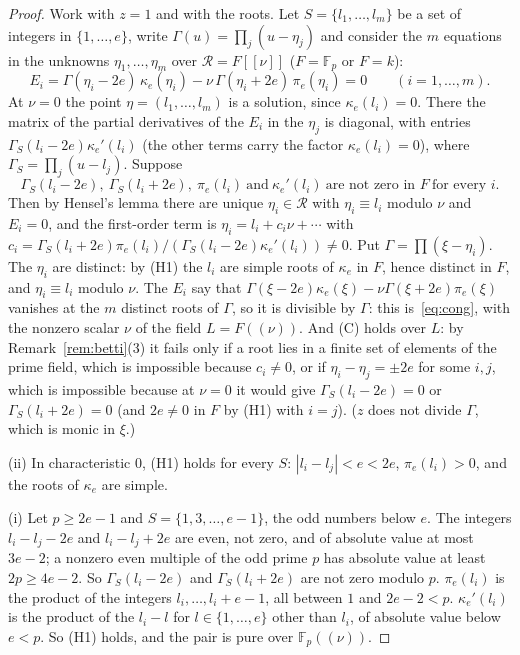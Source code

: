 \documentclass[11pt]{article}
\theoremstyle{definition}
\theoremstyle{remark}
\newcommand{\F}{\mathbb{F}}
\begin{document}
\begin{proof}
Work with $z=1$ and with the roots. Let $S=\{l_1,\dots,l_m\}$ be a set of integers in $\{1,\dots,e\}$, write $\Gamma(u)=\prod_j(u-\eta_j)$ and consider the $m$ equations in the unknowns $\eta_1,\dots,\eta_m$ over $\mathcal R=F[[\nu]]$ ($F=\F_p$ or $F=k$):
\[
E_i=\Gamma(\eta_i-2e)\,\kappa_e(\eta_i)-\nu\,\Gamma(\eta_i+2e)\,\pi_e(\eta_i)=0\qquad(i=1,\dots,m).
\]
At $\nu=0$ the point $\eta=(l_1,\dots,l_m)$ is a solution, since $\kappa_e(l_i)=0$. There the matrix of the partial derivatives of the $E_i$ in the $\eta_j$ is diagonal, with entries $\Gamma_S(l_i-2e)\kappa_e'(l_i)$ (the other terms carry the factor $\kappa_e(l_i)=0$), where $\Gamma_S=\prod_j(u-l_j)$. Suppose
\begin{equation}\tag{H1}
\Gamma_S(l_i-2e),\ \Gamma_S(l_i+2e),\ \pi_e(l_i)\ \text{and}\ \kappa_e'(l_i)\ \text{are not zero in }F\ \text{for every }i.
\end{equation}
Then by Hensel's lemma there are unique $\eta_i\in\mathcal R$ with $\eta_i\equiv l_i$ modulo $\nu$ and $E_i=0$, and the first-order term is $\eta_i=l_i+c_i\nu+\cdots$ with $c_i=\Gamma_S(l_i+2e)\pi_e(l_i)/(\Gamma_S(l_i-2e)\kappa_e'(l_i))\ne0$. Put $\Gamma=\prod(\xi-\eta_i)$. The $\eta_i$ are distinct: by (H1) the $l_i$ are simple roots of $\kappa_e$ in $F$, hence distinct in $F$, and $\eta_i\equiv l_i$ modulo $\nu$. The $E_i$ say that $\Gamma(\xi-2e)\kappa_e(\xi)-\nu\Gamma(\xi+2e)\pi_e(\xi)$ vanishes at the $m$ distinct roots of $\Gamma$, so it is divisible by $\Gamma$: this is~\eqref{eq:cong}, with the nonzero scalar $\nu$ of the field $L=F((\nu))$. And (C) holds over $L$: by Remark~\ref{rem:betti}(3) it fails only if a root lies in a finite set of elements of the prime field, which is impossible because $c_i\ne0$, or if $\eta_i-\eta_j=\pm2e$ for some $i,j$, which is impossible because at $\nu=0$ it would give $\Gamma_S(l_i-2e)=0$ or $\Gamma_S(l_i+2e)=0$ (and $2e\ne0$ in $F$ by (H1) with $i=j$). ($z$ does not divide $\Gamma$, which is monic in $\xi$.)

(ii) In characteristic $0$, (H1) holds for every $S$: $|l_i-l_j|<e<2e$, $\pi_e(l_i)>0$, and the roots of $\kappa_e$ are simple.

(i) Let $p\ge2e-1$ and $S=\{1,3,\dots,e-1\}$, the odd numbers below $e$. The integers $l_i-l_j-2e$ and $l_i-l_j+2e$ are even, not zero, and of absolute value at most $3e-2$; a nonzero even multiple of the odd prime $p$ has absolute value at least $2p\ge4e-2$. So $\Gamma_S(l_i-2e)$ and $\Gamma_S(l_i+2e)$ are not zero modulo $p$. $\pi_e(l_i)$ is the product of the integers $l_i,\dots,l_i+e-1$, all between $1$ and $2e-2<p$. $\kappa_e'(l_i)$ is the product of the $l_i-l$ for $l\in\{1,\dots,e\}$ other than $l_i$, of absolute value below $e<p$. So (H1) holds, and the pair is pure over $\F_p((\nu))$.


\end{proof}
\end{document}
